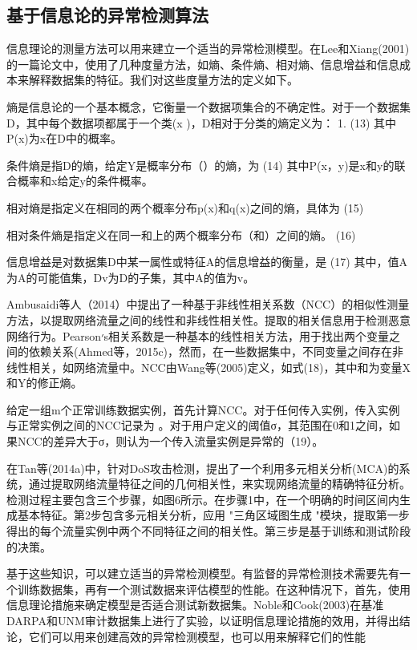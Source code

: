 \subsection{基于信息论的异常检测算法}

信息理论的测量方法可以用来建立一个适当的异常检测模型。在Lee和Xiang(2001)的一篇论文中，使用了几种度量方法，如熵、条件熵、相对熵、信息增益和信息成本来解释数据集的特征。我们对这些度量方法的定义如下。

熵是信息论的一个基本概念，它衡量一个数据项集合的不确定性。对于一个数据集D，其中每个数据项都属于一个类(x )，D相对于分类的熵定义为： 1.
(13)
其中P(x)为x在D中的概率。


条件熵是指D的熵，给定Y是概率分布（）的熵，为
(14)
其中P(x，y)是x和y的联合概率和x给定y的条件概率。


相对熵是指定义在相同的两个概率分布p(x)和q(x)之间的熵，具体为
(15)

相对条件熵是指定义在同一和上的两个概率分布（和）之间的熵。
(16)

信息增益是对数据集D中某一属性或特征A的信息增益的衡量，是
(17)
其中，值A为A的可能值集，Dv为D的子集，其中A的值为v。


Ambusaidi等人（2014）中提出了一种基于非线性相关系数（NCC）的相似性测量方法，以提取网络流量之间的线性和非线性相关性。提取的相关信息用于检测恶意网络行为。Pearson׳s相关系数是一种基本的线性相关方法，用于找出两个变量之间的依赖关系(Ahmed等，2015c)，然而，在一些数据集中，不同变量之间存在非线性相关，如网络流量中。NCC由Wang等(2005)定义，如式(18)，其中和为变量X和Y的修正熵。

给定一组m个正常训练数据实例，首先计算NCC。对于任何传入实例，传入实例与正常实例之间的NCC记录为 。对于用户定义的阈值σ，其范围在0和1之间，如果NCC的差异大于σ，则认为一个传入流量实例是异常的（19）。


在Tan等(2014a)中，针对DoS攻击检测，提出了一个利用多元相关分析(MCA)的系统，通过提取网络流量特征之间的几何相关性，来实现网络流量的精确特征分析。检测过程主要包含三个步骤，如图6所示。在步骤1中，在一个明确的时间区间内生成基本特征。第2步包含多元相关分析，应用 "三角区域图生成 "模块，提取第一步得出的每个流量实例中两个不同特征之间的相关性。第三步是基于训练和测试阶段的决策。


基于这些知识，可以建立适当的异常检测模型。有监督的异常检测技术需要先有一个训练数据集，再有一个测试数据来评估模型的性能。在这种情况下，首先，使用信息理论措施来确定模型是否适合测试新数据集。Noble和Cook(2003)在基准DARPA和UNM审计数据集上进行了实验，以证明信息理论措施的效用，并得出结论，它们可以用来创建高效的异常检测模型，也可以用来解释它们的性能

